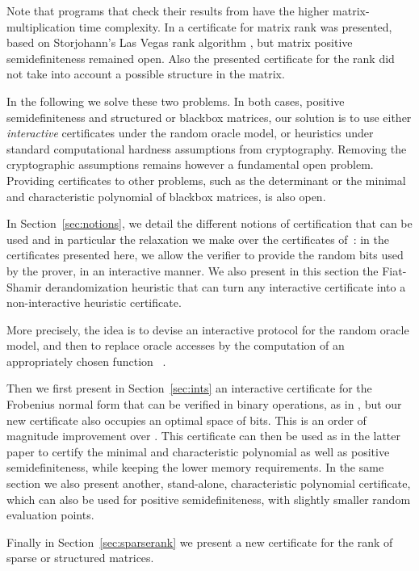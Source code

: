 \documentclass{article}
\newcommand{\psdness}{positive semidefiniteness\xspace}
\begin{document}
Note that programs that check their results from \cite{Blum:1995:checkwork}
have the higher matrix-multiplication time complexity. 
In \cite{Kaltofen:2011:quadcert} a certificate for matrix
rank was presented, based on Storjohann's Las Vegas rank algorithm
\cite{Storjohann:2009:IMR}, but matrix \psdness remained open.  
Also the presented certificate for the rank did not take into account a possible
structure in the matrix.

 
In the following we solve these two problems.
In both cases, \psdness and structured or blackbox matrices, our solution is to
use either {\em interactive} certificates under the random oracle model, or
heuristics under standard computational hardness assumptions from cryptography. 
Removing the cryptographic assumptions remains however a fundamental open
problem. Providing certificates to other problems, such as the determinant or
the minimal and characteristic polynomial of blackbox matrices, is also open.

In Section~\ref{sec:notions},
we detail the different notions of certification that can be used and in
particular the relaxation we make over the certificates
of~\cite{Kaltofen:2011:quadcert}: in the certificates presented here, we allow
the verifier to provide the random bits used by the prover, in an interactive
manner.
We also present in this section the Fiat-Shamir derandomization heuristic that
can turn any interactive certificate into a non-interactive heuristic
certificate.
 
More precisely, the idea is to devise an interactive protocol for the random
oracle model, and then to replace oracle accesses by the computation of an
appropriately chosen function
~\cite{Fiat:1986:Shamir,Bellare:1993:randomoracle}.

 
Then we first present in Section~\ref{sec:ints} an interactive certificate for
the Frobenius normal form that can be verified in
 binary operations, as in
\cite{Kaltofen:2011:quadcert}, but our new certificate also occupies an optimal
space of  bits. 
This is an order of magnitude improvement over
\cite[Theorem~4]{Kaltofen:2011:quadcert}.  
This certificate can then be used as in the latter paper to certify the minimal
and characteristic polynomial as well as \psdness, while keeping the lower
memory requirements. In the same section we also present another, stand-alone,
characteristic polynomial certificate, which can also be used for \psdness, with
slightly smaller random evaluation points.

Finally in Section~\ref{sec:sparserank} we present a new certificate for the
rank of sparse or structured matrices.
 
\end{document}
